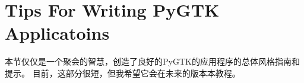 \chapter{Tips For Writing PyGTK Applicatoins}
本节仅仅是一个聚会的智慧，创造了良好的PyGTK的应用程序的总体风格指南和提示。
目前，这部分很短，但我希望它会在未来的版本本教程。
